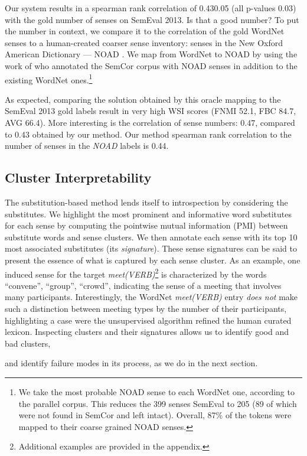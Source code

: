 \documentclass[11pt,a4paper]{article}
\begin{document}
Our system results in a spearman rank correlation of 0.430.05 (all p-values  0.03) with the gold number of senses on
SemEval 2013.
Is that a good number? To put the number in context, we compare it to the
correlation of the gold WordNet senses to a human-created coarser sense
inventory: senses in the New Oxford American Dictionary --- NOAD \citep{noad-dict}. We map from
WordNet to NOAD by using the work of \citet{naod} who annotated the SemCor
corpus with NOAD senses in addition to the existing WordNet ones.\footnote{We
take the most probable NOAD sense to each WordNet one, according to the
parallel corpus. This reduces the 399 senses SemEval to 205 (89 of which were
not found in SemCor and left intact). Overall, 87\% of the tokens were mapped to
their coarse grained NOAD senses.}

As expected, comparing the solution obtained by this oracle mapping to the
SemEval 2013 gold labels result in very high WSI scores (FNMI 52.1, FBC 84.7,
AVG 66.4). More interesting is the correlation of sense numbers: 0.47, compared to
0.43 obtained by our method. Our method spearman rank correlation to the number of senses in the \emph{NOAD} labels is 0.44.

\subsection{Cluster Interpretability}
The substitution-based method lends itself to introspection by considering the substitutes. We highlight the most prominent and informative word substitutes for each sense by computing the pointwise mutual
information (PMI) between substitute words and sense clusters. We then annotate each
sense with its top 10 most associated substitutes (its \emph{signature}). These sense signatures can be said to present the essence of what is captured by
each sense cluster.
As an example, one induced sense for the target \emph{meet(VERB)}\footnote{Additional examples are provided in the appendix.} is characterized by the words ``convene'', ``group'', ``crowd'', indicating the sense of a meeting that involves many participants. Interestingly, the WordNet \emph{meet(VERB)} entry \emph{does not} make such a distinction between meeting types by the number of their participants, highlighting a case were the unsupervised algorithm refined the human curated lexicon.
Inspecting clusters and their signatures allows us to identify good and bad clusters,

and identify failure modes in its process, as we do in the next section. 
\end{document}
